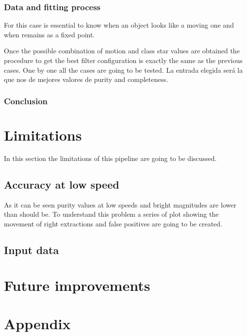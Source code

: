 \documentclass{article}
\begin{document}
\subsubsection{Data and fitting process}
For this case is essential to know when an object looks like a moving one and when remains as a fixed point.


\par Once the possible combination of motion and class star values are obtained the procedure to get the best filter configuration is exactly the same as the previous cases. One by one all the cases are going to be tested. La entrada elegida será la que nos de mejores valores de purity and completeness.

\subsubsection{Conclusion}

\section{Limitations}
In this section the limitations of this pipeline are going to be discussed.

\subsection{Accuracy at low speed}
As it can be seen purity values at low speeds and bright magnitudes are lower than should be. To understand this problem a series of plot showing the movement of right extractions and false positives are going to be created. 

\subsection{Input data}

\section{Future improvements}

\newpage\null\newpage

\section*{Appendix}
\end{document}
